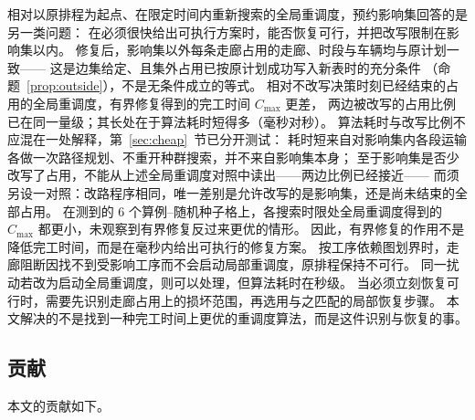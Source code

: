 \documentclass[manuscript,screen,review]{acmart}
\begin{document}
相对以原排程为起点、在限定时间内重新搜索的全局重调度，预约影响集回答的是另一类问题：
在必须很快给出可执行方案时，能否恢复可行，并把改写限制在影响集以内。
修复后，影响集以外每条走廊占用的走廊、时段与车辆均与原计划一致——
这是边集给定、且集外占用已按原计划成功写入新表时的充分条件
（命题~\ref{prop:outside}），不是无条件成立的等式。
相对不改写决策时刻已经结束的占用的全局重调度，有界修复得到的完工时间 \(C_{\max}\) 更差，
两边被改写的占用比例已在同一量级；其长处在于算法耗时短得多（毫秒对秒）。
算法耗时与改写比例不应混在一处解释，第~\ref{sec:cheap}~节已分开测试：
耗时短来自对影响集内各段运输各做一次路径规划、不重开种群搜索，并不来自影响集本身；
至于影响集是否少改写了占用，不能从上述全局重调度对照中读出——两边比例已经接近——
而须另设一对照：改路程序相同，唯一差别是允许改写的是影响集，还是尚未结束的全部占用。
在测到的 \(6\) 个算例--随机种子格上，各搜索时限处全局重调度得到的 \(C_{\max}\) 都更小，未观察到有界修复反过来更优的情形。
因此，有界修复的作用不是降低完工时间，而是在毫秒内给出可执行的修复方案。
按工序依赖图划界时，走廊阻断因找不到受影响工序而不会启动局部重调度，原排程保持不可行。
同一扰动若改为启动全局重调度，则可以处理，但算法耗时在秒级。
当必须立刻恢复可行时，需要先识别走廊占用上的损坏范围，再选用与之匹配的局部恢复步骤。
本文解决的不是找到一种完工时间上更优的重调度算法，而是这件识别与恢复的事。

\subsection{贡献}
\label{sec:contributions}

本文的贡献如下。
\end{document}
